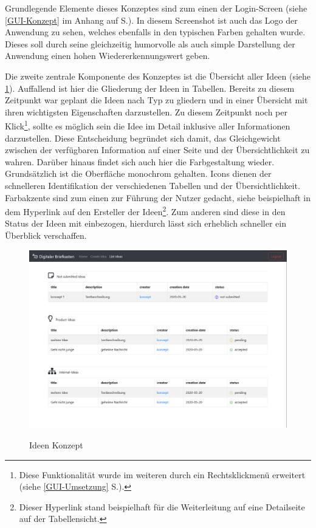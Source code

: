 Grundlegende Elemente dieses Konzeptes sind zum einen der Login-Screen (siehe \ref{GUI-Konzept} im Anhang auf S.\pageref{GUI-Konzept}).
In diesem Screenshot ist auch das Logo der Anwendung zu sehen, welches ebenfalls in den typischen Farben gehalten wurde. Dieses soll durch seine gleichzeitig humorvolle als auch simple Darstellung der Anwendung einen hohen Wiedererkennungswert geben.

Die zweite zentrale Komponente des Konzeptes ist die Übersicht aller Ideen (siehe \cref{fig:ideen}).
Auffallend ist hier die Gliederung der Ideen in Tabellen. Bereits zu diesem Zeitpunkt war geplant die Ideen nach Typ zu gliedern und in einer Übersicht mit ihren wichtigsten Eigenschaften darzustellen.
Zu diesem Zeitpunkt noch per Klick\footnote{Diese Funktionalität wurde im weiteren durch ein Rechtsklickmenü erweitert (siehe \ref{GUI-Umsetzung} S.\pageref{GUI-Umsetzung}).}, sollte es möglich sein die Idee im Detail inklusive aller Informationen darzustellen. Diese Entscheidung begründet sich damit, das Gleichgewicht zwischen der verfügbaren Information auf einer Seite und der Übersichtlichkeit zu wahren.
Darüber hinaus findet sich auch hier die Farbgestaltung wieder. Grundsätzlich ist die Oberfläche monochrom gehalten. Icons dienen der schnelleren Identifikation der verschiedenen Tabellen und der Übersichtlichkeit. Farbakzente sind zum einen zur Führung der Nutzer gedacht, siehe beispielhaft in dem Hyperlink auf den Ersteller der Ideen\footnote{Dieser Hyperlink stand beispielhaft für die Weiterleitung auf eine Detailseite auf der Tabellensicht.}. Zum anderen sind diese in den Status der Ideen mit einbezogen, hierdurch lässt sich erheblich schneller ein Überblick verschaffen.

\begin{figure}[h!!]
    \centering
    \begin{minipage}[t]{1\textwidth}
        \caption{Ideen Konzept}
        \includegraphics[width=1\textwidth]{img/ideen-Konzept.png}\\
        \label{fig:ideen}
    \end{minipage}
\end{figure}


